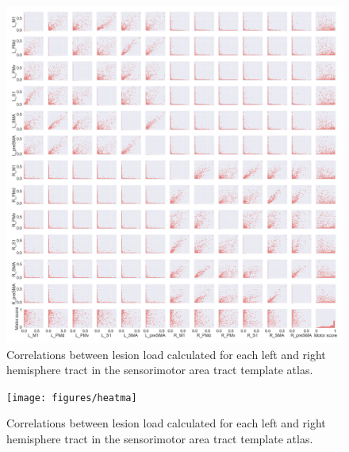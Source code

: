 \documentclass[10pt]{article}
\begin{document}
\begin{figure}[ht]
\centering
\includegraphics[width=1\linewidth]{figures/SMATT_bi_scatterplts.png}
\caption{Correlations between lesion load calculated for each left and right hemisphere tract in the sensorimotor area tract template atlas.}
\label{smatt_pairwise_correlations_bi}
\end{figure}

\begin{figure}[ht]
\centering
\texttt{[image: figures/heatma]}
\caption{Correlations between lesion load calculated for each left and right hemisphere tract in the sensorimotor area tract template atlas.}
\label{smatt_pairwise_correlations_bi}
\end{figure}
\end{document}
